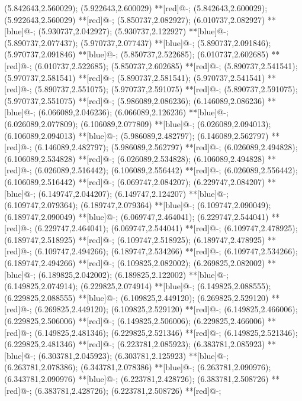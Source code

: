 (5.842643,2.560029); (5.922643,2.600029) **[red]@{-};
(5.842643,2.600029); (5.922643,2.560029) **[red]@{-};
(5.850737,2.082927); (6.010737,2.082927) **[blue]@{-};
(5.930737,2.042927); (5.930737,2.122927) **[blue]@{-};
(5.890737,2.077437); (5.970737,2.077437) **[blue]@{-};
(5.890737,2.091846); (5.970737,2.091846) **[blue]@{-};
(5.850737,2.522685); (6.010737,2.602685) **[red]@{-};
(6.010737,2.522685); (5.850737,2.602685) **[red]@{-};
(5.890737,2.541541); (5.970737,2.581541) **[red]@{-};
(5.890737,2.581541); (5.970737,2.541541) **[red]@{-};
(5.890737,2.551075); (5.970737,2.591075) **[red]@{-};
(5.890737,2.591075); (5.970737,2.551075) **[red]@{-};
(5.986089,2.086236); (6.146089,2.086236) **[blue]@{-};
(6.066089,2.046236); (6.066089,2.126236) **[blue]@{-};
(6.026089,2.077809); (6.106089,2.077809) **[blue]@{-};
(6.026089,2.094013); (6.106089,2.094013) **[blue]@{-};
(5.986089,2.482797); (6.146089,2.562797) **[red]@{-};
(6.146089,2.482797); (5.986089,2.562797) **[red]@{-};
(6.026089,2.494828); (6.106089,2.534828) **[red]@{-};
(6.026089,2.534828); (6.106089,2.494828) **[red]@{-};
(6.026089,2.516442); (6.106089,2.556442) **[red]@{-};
(6.026089,2.556442); (6.106089,2.516442) **[red]@{-};
(6.069747,2.084207); (6.229747,2.084207) **[blue]@{-};
(6.149747,2.044207); (6.149747,2.124207) **[blue]@{-};
(6.109747,2.079364); (6.189747,2.079364) **[blue]@{-};
(6.109747,2.090049); (6.189747,2.090049) **[blue]@{-};
(6.069747,2.464041); (6.229747,2.544041) **[red]@{-};
(6.229747,2.464041); (6.069747,2.544041) **[red]@{-};
(6.109747,2.478925); (6.189747,2.518925) **[red]@{-};
(6.109747,2.518925); (6.189747,2.478925) **[red]@{-};
(6.109747,2.494266); (6.189747,2.534266) **[red]@{-};
(6.109747,2.534266); (6.189747,2.494266) **[red]@{-};
(6.109825,2.082002); (6.269825,2.082002) **[blue]@{-};
(6.189825,2.042002); (6.189825,2.122002) **[blue]@{-};
(6.149825,2.074914); (6.229825,2.074914) **[blue]@{-};
(6.149825,2.088555); (6.229825,2.088555) **[blue]@{-};
(6.109825,2.449120); (6.269825,2.529120) **[red]@{-};
(6.269825,2.449120); (6.109825,2.529120) **[red]@{-};
(6.149825,2.466006); (6.229825,2.506006) **[red]@{-};
(6.149825,2.506006); (6.229825,2.466006) **[red]@{-};
(6.149825,2.481346); (6.229825,2.521346) **[red]@{-};
(6.149825,2.521346); (6.229825,2.481346) **[red]@{-};
(6.223781,2.085923); (6.383781,2.085923) **[blue]@{-};
(6.303781,2.045923); (6.303781,2.125923) **[blue]@{-};
(6.263781,2.078386); (6.343781,2.078386) **[blue]@{-};
(6.263781,2.090976); (6.343781,2.090976) **[blue]@{-};
(6.223781,2.428726); (6.383781,2.508726) **[red]@{-};
(6.383781,2.428726); (6.223781,2.508726) **[red]@{-};
